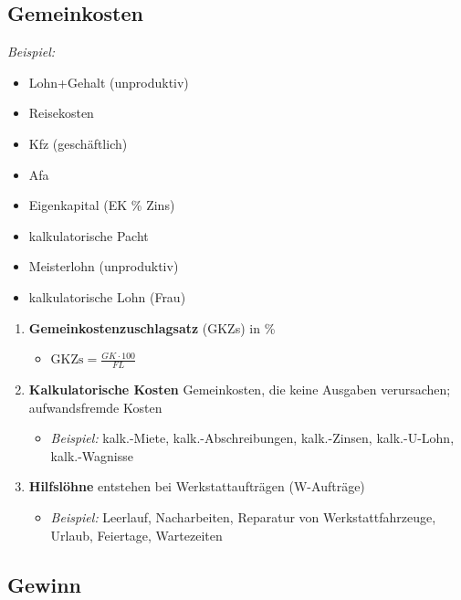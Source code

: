 \subsection{Gemeinkosten}\label{gemeinkosten}

\emph{Beispiel:}

\begin{itemize}
\item
  Lohn+Gehalt (unproduktiv)
\item
  Reisekosten
\item
  Kfz (geschäftlich)
\item
  Afa
\item
  Eigenkapital (EK \% Zins)
\item
  kalkulatorische Pacht
\item
  Meisterlohn (unproduktiv)
\item
  kalkulatorische Lohn (Frau)
\end{itemize}

\begin{enumerate}
\item
  \textbf{Gemeinkostenzuschlagsatz} (GKZs) in \%

  \begin{itemize}
  \item
    $\boxed{\text{GKZs} = \frac{GK \cdot 100}{FL}}$
  \end{itemize}
\item
  \textbf{Kalkulatorische Kosten} Gemeinkosten, die keine Ausgaben
  verursachen; aufwandsfremde Kosten

  \begin{itemize}
  \item
    \emph{Beispiel:} kalk.-Miete, kalk.-Abschreibungen, kalk.-Zinsen,
    kalk.-U-Lohn, kalk.-Wagnisse
  \end{itemize}
\item
  \textbf{Hilfslöhne} entstehen bei Werkstattaufträgen (W-Aufträge)

  \begin{itemize}
  \item
    \emph{Beispiel:} Leerlauf, Nacharbeiten, Reparatur von
    Werkstattfahrzeuge, Urlaub, Feiertage, Wartezeiten
  \end{itemize}
\end{enumerate}

\subsection{Gewinn}\label{gewinn}

